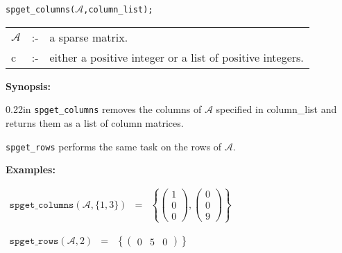 \hspace*{0.175in} \texttt{spget\_columns($\mathcal{A}$,column\_list);}

\hspace*{0.1in} 
\begin{tabular}{l l l}
$\mathcal{A}$ &:-& a sparse matrix. \\
c          &:-& either a positive integer or a list of positive 
                integers.
\end{tabular}

\textbf{Synopsis:} %

\begin{addtolength}{\leftskip}{0.22in}
\texttt{spget\_columns} removes the columns of $\mathcal{A}$ specified in 
                column\_list and returns them as a list of column 
                matrices. 

\end{addtolength}
\hspace*{0.175in} \texttt{spget\_rows} performs the same task on the rows of 
                $\mathcal{A}$. 

\textbf{Examples:}

\begin{flushleft}  
\hspace*{0.1in}
\begin{math}  
\begin{array}{ccc}
\texttt{spget\_columns}(\mathcal{A},\{1,3\}) & = & 
\left\{ 
        \left( \begin{array}{c} 1 \\ 0 \\ 0 \end{array} \right),
        \left( \begin{array}{c} 0 \\ 0 \\ 9 \end{array} \right) 
\right\} 
\end{array}
\end{math}  
\end{flushleft}

\vspace*{0.1in}

\begin{flushleft}  
\hspace*{0.1in}
\begin{math}  
\begin{array}{ccc}
\texttt{spget\_rows}(\mathcal{A},2) & = & 
\left\{ 
        \left( \begin{array}{ccc} 0 & 5 & 0 \end{array} \right)
\right\} 
\end{array}
\end{math}  
\end{flushleft}

